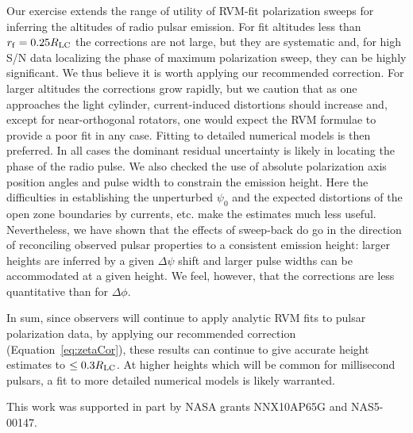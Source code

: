 	Our exercise extends the range of utility of RVM-fit polarization
sweeps for inferring the altitudes of radio pulsar emission. For fit altitudes
less than $r_{\rm{f}} = 0.25 R_{\rm{LC}}$ the corrections are not large, but they are
systematic and, for high S/N data localizing the phase of maximum polarization
sweep, they can be highly significant. We thus believe it is worth applying our recommended
correction. For larger altitudes the corrections grow rapidly, but we caution
that as one approaches the light cylinder, current-induced distortions
should increase and, except for near-orthogonal rotators, one would expect the RVM
formulae to provide a poor fit in any case. Fitting to detailed numerical models
is then preferred. In all cases the dominant residual uncertainty is likely in
locating the phase of the radio pulse.
We also checked the use of absolute polarization axis position angles
and pulse width to constrain the emission height. Here the difficulties in
establishing the unperturbed $\psi_0$ and the expected distortions of the open zone
boundaries by currents, etc. make the estimates much less useful. Nevertheless,
we have shown that the effects of sweep-back do go in the direction of reconciling
observed pulsar properties to a consistent emission height: larger heights are
inferred by a given $\Delta \psi$ shift and larger pulse widths can be accommodated
at a given height. We feel, however, that the corrections are less quantitative
than for $\Delta \phi$.

	In sum, since observers will continue to apply analytic RVM fits
to pulsar polarization data, by applying our recommended 
correction (Equation~\ref{eq:zetaCor}), these results
can continue to give accurate height estimates to $\le 0.3 R_{\rm{LC}}$. At higher heights
which will be common for millisecond pulsars, a fit to more detailed numerical
models is likely warranted.

\acknowledgements

This work was supported in part by NASA grants NNX10AP65G and NAS5-00147.



